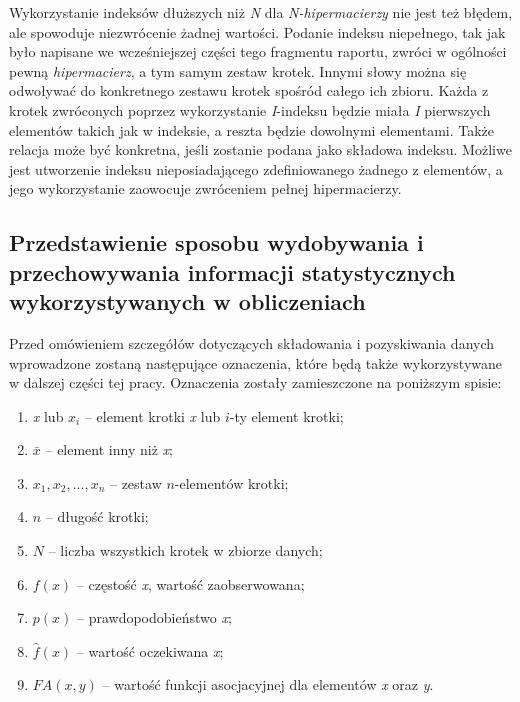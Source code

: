\documentclass[11pt,a4paper]{llncs}
\begin{document}
Wykorzystanie indeksów dłuższych niż \emph{N} dla \emph{N-hipermacierzy} nie jest też błędem, ale spowoduje niezwrócenie żadnej wartości.
Podanie indeksu niepełnego, tak jak było napisane we wcześniejszej części tego fragmentu raportu, zwróci w ogólności pewną \emph{hipermacierz}, a tym samym zestaw krotek.
Innymi słowy można się odwoływać do konkretnego zestawu krotek spośród całego ich zbioru. 
Każda z krotek zwróconych poprzez wykorzystanie \emph{I}-indeksu będzie miała \emph{I} pierwszych elementów takich jak w indeksie, a reszta będzie dowolnymi elementami.
Także relacja może być konkretna, jeśli zostanie podana jako składowa indeksu.
Możliwe jest utworzenie indeksu nieposiadającego zdefiniowanego żadnego z elementów, a jego wykorzystanie zaowocuje zwróceniem pełnej hipermacierzy.


\subsection{Przedstawienie sposobu wydobywania i przechowywania informacji statystycznych wykorzystywanych w obliczeniach}
Przed omówieniem szczegółów dotyczących składowania i pozyskiwania danych wprowadzone zostaną następujące oznaczenia, które będą także wykorzystywane w dalszej części tej pracy.
Oznaczenia zostały zamieszczone na poniższym spisie:

\begin{enumerate}
	\item \emph{x} lub \( {x_{i}} \) -- element krotki \emph{x} lub $i$-ty element krotki;
	\item \( \bar{x} \) -- element inny niż \emph{x};
	\item $ x_{1}, x_{2}, ..., x_{n} $ -- zestaw $n$-elementów krotki;
	\item $n$ -- długość krotki;
	\item \( N \) -- liczba wszystkich krotek w zbiorze danych;
	\item \( f(x) \) -- częstość \emph{x}, wartość zaobserwowana;
	\item \( p(x) \) -- prawdopodobieństwo \emph{x};
	\item \( \hat{f}(x) \) -- wartość oczekiwana \emph{x};
	\item \( FA(x, y) \) -- wartość funkcji asocjacyjnej dla elementów \emph{x} oraz \emph{y}.
\end{enumerate}
\end{document}
